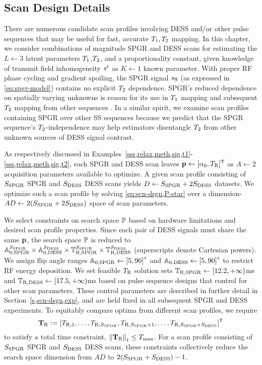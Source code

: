 \subsection{Scan Design Details}
\label{ss,scn-dsgn,opt,design}

There are numerous candidate scan profiles
involving DESS and/or other pulse sequences
that may be useful
for fast, accurate $T_1,T_2$ mapping.
In this chapter,
we consider combinations
of magnitude SPGR and DESS scans
for estimating the $L\gets3$ latent parameters
$T_1$,$T_2$, and a proportionality constant,
given knowledge 
of transmit field inhomogeneity $s^{\mathrm{t}}$
as $K \gets 1$ known parameter.
With proper RF phase cycling
and gradient spoiling,
the SPGR signal $s_{\mathrm{S}}$
(as expressed in \eqref{eq:spgr-model})
contains no explicit $T_2$ dependence.
SPGR's reduced dependence
on spatially varying unknowns
is reason for its use in $T_1$ mapping
\cite{fram:87:rco, chang:08:lls, wang:12:srt}
and subsequent $T_2$ mapping
from other sequences
\cite{deoni:03:rct, nataraj:14:mbe}.
In a similar spirit, 
we examine scan profiles containing SPGR 
over other SS sequences because we predict 
that the SPGR sequence's $T_2$-independence 
may help estimators disentangle $T_2$ 
from other unknown sources of DESS signal contrast.

As respectively discussed
in Examples~\ref{sss,relax,meth,sig,t1}-\ref{sss,relax,meth,sig,t2},
each SPGR and DESS scan leaves 
$\mathbf{p} \gets [\alpha_0, T_\mathrm{R}]^{\mathsf{T}}$
as $A \gets 2$ acquisition parameters
available to optimize.
A given scan profile consisting 
of $S_{\mathrm{SPGR}}$ SPGR and $S_{\mathrm{DESS}}$ DESS scans 
yields $D \gets S_{\mathrm{SPGR}} + 2S_{\mathrm{DESS}}$ datasets. 
We optimize such a scan profile 
by solving \eqref{eq:scn-dsgn,P-star} 
over a dimension-$AD \gets 2(S_{\mathrm{SPGR}} + 2S_{\mathrm{DESS}})$ space 
of scan parameters.

We select constraints 
on search space $\mathbb{P}$ based 
on hardware limitations 
and desired scan profile properties. 
Since each pair of DESS signals 
must share the same $\mathbf{p}$, 
the search space $\mathbb{P}$ is reduced to 
$\mathbb{A}_{0,\mathrm{SPGR}}^{S_{\mathrm{SPGR}}} \times \mathbb{A}_{0,\mathrm{DESS}}^{S_{\mathrm{DESS}}} \times \mathbb{T}_{\mathrm{R,SPGR}}^{S_{\mathrm{SPGR}}} \times \mathbb{T}_{\mathrm{R,DESS}}^{S_{\mathrm{DESS}}}$ 
(superscripts denote Cartesian powers). 
We assign flip angle ranges 
$\setAs \gets \brac{5, 90}^\circ$ 
and $\setAd \gets \brac{5, 90}^\circ$
to restrict RF energy deposition. 
We set feasible $T_\mathrm{R}$ solution sets 
$\mathbb{T}_{\mathrm{R,SPGR}} \gets [12.2, +\infty)$ms 
and $\mathbb{T}_{\mathrm{R,DESS}} \gets [17.5, +\infty)$ms 
based on pulse sequence designs 
that control for other scan parameters. 
These control parameters are described 
in further detail in Section~\ref{s,scn-dsgn,exp}, 
and are held fixed 
in all subsequent SPGR and DESS experiments. 
To equitably compare optima 
from different scan profiles, 
we require 
$$\mathbf{T}_\mathrm{R} := [T_{\mathrm{R},1}, \dots, T_{\mathrm{R},{S_{\mathrm{SPGR}}}}, 
T_{\mathrm{R},{S_{\mathrm{SPGR}}}+1}, \dots, T_{\mathrm{R},{S_{\mathrm{SPGR}} + S_{\mathrm{DESS}}}}]^{\mathsf{T}}$$ 
to satisfy a total time constraint, 
$\norm{\bmTR}_1 \le \Tmax$. 
For a scan profile consisting 
of $S_{\mathrm{SPGR}}$ SPGR and $S_{\mathrm{DESS}}$ DESS scans, 
these constraints collectively reduce the search space dimension 
from $AD$ to $2(S_{\mathrm{SPGR}} + S_{\mathrm{DESS}}) -1$. 

